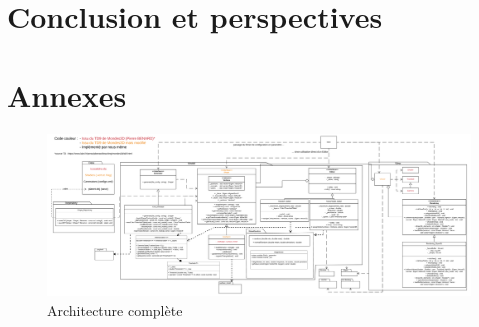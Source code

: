 \documentclass[a4paper]{article}
\begin{document}
\newpage
\section{Conclusion et perspectives}

\section{Annexes}

\begin{figure}[!ht]
    \begin{center}
        \includegraphics[width=1.5\linewidth, angle=90]{img/archi/Archi_Complete.png} 
        \caption{Architecture complète}
        \label{archiComplete}
    \end{center}
\end{figure}




\end{document}
